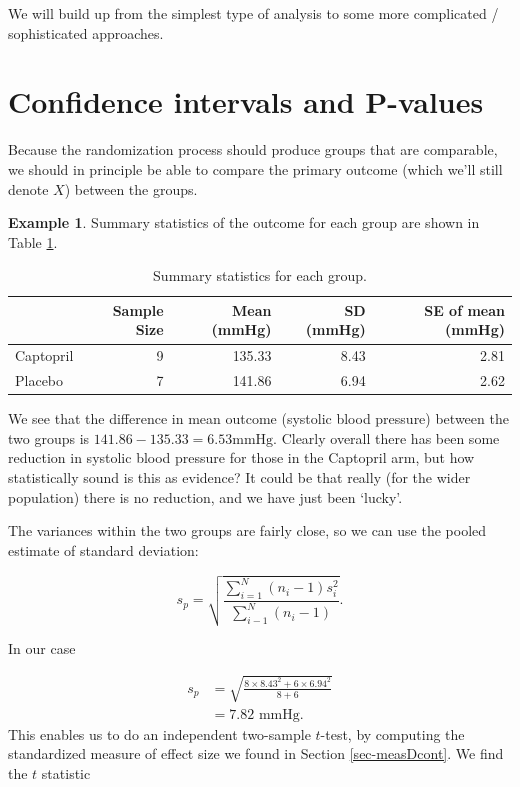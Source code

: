 \documentclass[
  openany]{book}
\theoremstyle{definition}
\theoremstyle{definition}
\newtheorem{example}{Example}[chapter]
\theoremstyle{definition}
\theoremstyle{definition}
\theoremstyle{remark}
\begin{document}
We will build up from the simplest type of analysis to some more complicated / sophisticated approaches.

\section{Confidence intervals and P-values}\label{ttest}

Because the randomization process should produce groups that are comparable, we should in principle be able to compare the primary outcome (which we'll still denote \(X\)) between the groups.

\begin{example}
\protect\hypertarget{exm:captopril2}{}\label{exm:captopril2}Summary statistics of the outcome for each group are shown in Table \ref{tab:outsumhommel}.

\begin{table}

\caption{\label{tab:outsumhommel}Summary statistics for each group.}
\centering
\begin{tabular}[t]{l|r|r|r|r}
\hline
  & Sample Size & Mean (mmHg) & SD (mmHg) & SE of mean (mmHg)\\
\hline
Captopril & 9 & 135.33 & 8.43 & 2.81\\
\hline
Placebo & 7 & 141.86 & 6.94 & 2.62\\
\hline
\end{tabular}
\end{table}

We see that the difference in mean outcome (systolic blood pressure) between the two groups is \(141.86 - 135.33 = 6.53 \text{mmHg}\). Clearly overall there has been some reduction in systolic blood pressure for those in the Captopril arm, but how statistically sound is this as evidence? It could be that really (for the wider population) there is no reduction, and we have just been `lucky'.

The variances within the two groups are fairly close, so we can use the pooled estimate of standard deviation:

\[
  s_p = \sqrt{\frac{\sum\limits_{i=1}^N\left(n_i-1\right)s_i^2}{\sum\limits_{i-1}^N\left(n_i-1\right)}}.
\]

In our case

\[ 
  \begin{aligned}
s_p&= \sqrt{\frac{8\times{8.43^2} + 6 \times{6.94^2}}{8+6}}\\
& = 7.82\text{ mmHg.}
\end{aligned}
\]
This enables us to do an independent two-sample \(t\)-test, by computing the standardized measure of effect size we found in Section \ref{sec-measDcont}. We find the \(t\) statistic


\end{example}
\end{document}
